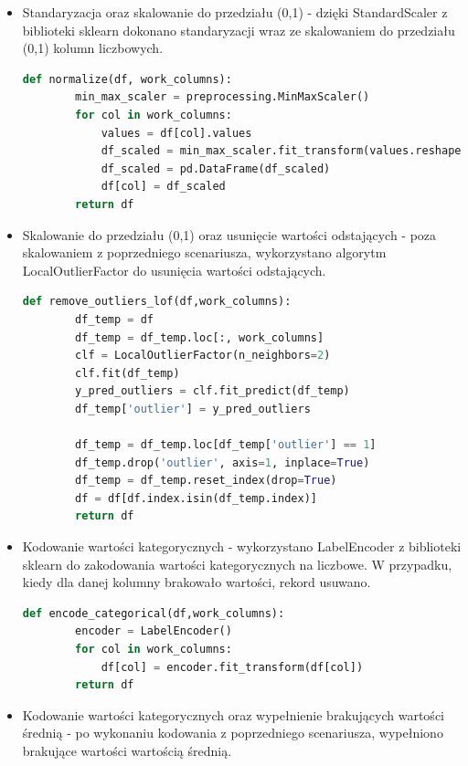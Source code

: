 \documentclass[oneside]{book}
\begin{document}
\begin{itemize}
\item Standaryzacja oraz skalowanie do przedziału (0,1) -
dzięki StandardScaler z biblioteki sklearn dokonano 
standaryzacji wraz ze skalowaniem do przedziału (0,1) 
kolumn liczbowych.

\begin{lstlisting}[language=Python, caption={Skalowanie do 
    przedziału (0,1)}, captionpos=b]
    def normalize(df, work_columns):
        min_max_scaler = preprocessing.MinMaxScaler()
        for col in work_columns:
            values = df[col].values
            df_scaled = min_max_scaler.fit_transform(values.reshape(-1, 1)) 
            df_scaled = pd.DataFrame(df_scaled)
            df[col] = df_scaled
        return df
\end{lstlisting}

\item Skalowanie do przedziału (0,1) oraz usunięcie 
wartości odstających -
poza skalowaniem z poprzedniego scenariusza, 
wykorzystano algorytm LocalOutlierFactor do usunięcia 
wartości odstających.

\begin{lstlisting}[language=Python, caption={Usuwanie wartości 
    odstających}, captionpos=b]
    def remove_outliers_lof(df,work_columns):
        df_temp = df
        df_temp = df_temp.loc[:, work_columns]
        clf = LocalOutlierFactor(n_neighbors=2)
        clf.fit(df_temp)
        y_pred_outliers = clf.fit_predict(df_temp)
        df_temp['outlier'] = y_pred_outliers

        df_temp = df_temp.loc[df_temp['outlier'] == 1]
        df_temp.drop('outlier', axis=1, inplace=True)
        df_temp = df_temp.reset_index(drop=True)
        df = df[df.index.isin(df_temp.index)]
        return df
\end{lstlisting}

\item Kodowanie wartości kategorycznych -
wykorzystano LabelEncoder z biblioteki sklearn do 
zakodowania wartości kategorycznych na liczbowe. 
W przypadku, kiedy dla danej kolumny brakowało wartości, 
rekord usuwano.

\begin{lstlisting}[language=Python, caption={Usuwanie wartości 
    odstających}, captionpos=b]
    def encode_categorical(df,work_columns):
        encoder = LabelEncoder()
        for col in work_columns:
            df[col] = encoder.fit_transform(df[col])
        return df
\end{lstlisting}

\item Kodowanie wartości kategorycznych oraz wypełnienie 
brakujących wartości średnią -
po wykonaniu kodowania z poprzedniego scenariusza, 
wypełniono brakujące wartości wartością średnią.

\end{itemize}
\end{document}
